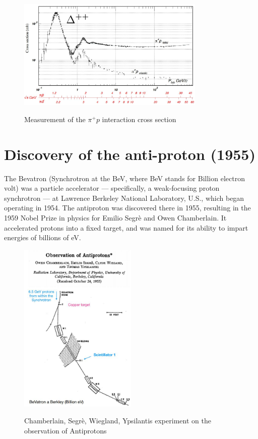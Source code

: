 \begin{figure}[h]
    \centering
    \includegraphics[width=0.8\textwidth]{Figures/FNSN31_8.JPG}
    \label{fig:Wu6}
    \caption{Measurement of the $\pi^+p$  interaction cross section}
\end{figure} 
\vspace{3mm}

\section{Discovery of the anti-proton (1955)}

The Bevatron (Synchrotron at the BeV, where BeV stands for Billion electron volt) was a particle accelerator — specifically, a weak-focusing proton synchrotron — at Lawrence Berkeley National Laboratory, U.S., which began operating in 1954. The antiproton was discovered there in 1955, resulting in the 1959 Nobel Prize in physics for Emilio Segrè and Owen Chamberlain. It accelerated protons into a fixed target, and was named for its ability to impart energies of billions of eV. 

\begin{figure}[!h]
    \centering
    \includegraphics[width=0.5\textwidth]{Figures/FNSN31_9.JPG}
    \label{fig:antip0}
    \caption{Chamberlain, Segrè, Wiegland, Ypsilantis experiment on the observation of Antiprotons}
\end{figure} 

